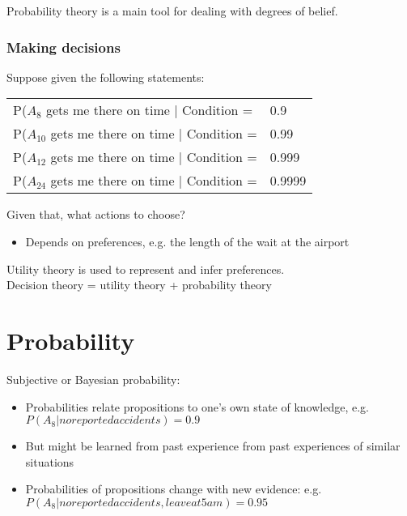 Probability theory is a main tool for dealing with degrees of belief.\\

\subsubsection{Making decisions}
Suppose given the following statements:\\

\begin{table}[h]
\centering
\begin{tabular}{l l}
P($A_8$  gets me there on time | Condition = & 0.9\\
P($A_{10}$ gets me there on time | Condition = & 0.99\\
P($A_{12}$ gets me there on time | Condition = & 0.999\\
P($A_{24}$ gets me there on time | Condition = & 0.9999\\
\end{tabular}
\end{table}

Given that, what actions to choose?\\
\begin{itemize}
\item Depends on preferences, e.g. the length of the wait at the airport
\end{itemize}

Utility theory is used to represent and infer preferences.\\
Decision theory = utility theory + probability theory\\

\section{Probability}
Subjective or Bayesian probability:\\

\begin{itemize}
\item Probabilities relate propositions to one's own state of knowledge, e.g. $P(A_8 | no reported accidents) = 0.9$
\item But might be learned from past experience from past experiences of similar situations
\item Probabilities of propositions change with new evidence: e.g. $P(A_8|no reported accidents, leave at 5 am) = 0.95$
\end{itemize}

